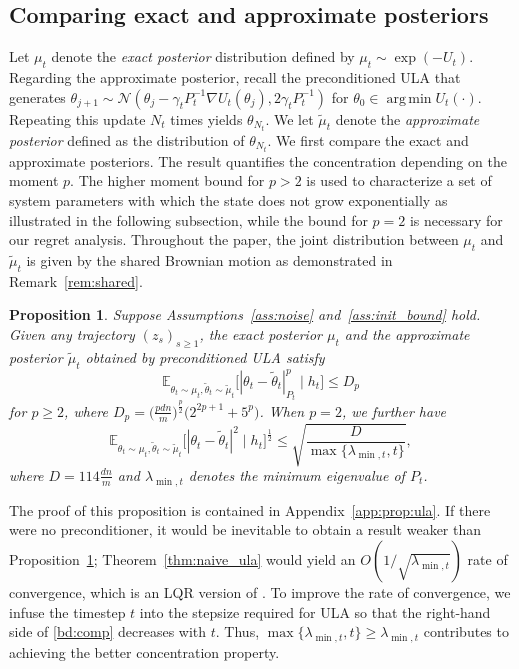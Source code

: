 \documentclass[11pt]{article}
\theoremstyle{plain}
\newtheorem{prop}[thm]{Proposition}
\theoremstyle{definition}
\theoremstyle{remark}
\DeclareMathOperator*{\argmin}{arg\,min}
\begin{document}
\subsection{Comparing exact and approximate posteriors}

Let $\mu_t$ denote the \emph{exact posterior} distribution defined by $\mu_t \sim \exp (-U_t)$.
Regarding the approximate posterior, recall the preconditioned ULA that generates
$\theta_{j+1} \sim \mathcal{N} ( \theta_j - \gamma_t P_t^{-1} \nabla U_t (\theta_j), 2\gamma_t P_t^{-1})$ for $\theta_0 \in  \argmin U_t (\cdot)$.
Repeating this update $N_t$ times yields $\theta_{N_t}$.
We let $\tilde{\mu}_t$ denote the \emph{approximate posterior} defined as the distribution of $\theta_{N_t}$. 
We first compare the exact and approximate posteriors. 
The result quantifies the concentration depending on the moment $p$. The higher moment bound for $p>2$ is used to characterize a set of system parameters with which the state does not grow exponentially as illustrated in the following subsection, while the bound for $p=2$ is necessary for our regret analysis.
Throughout the paper, the joint distribution between $\mu_t$ and $\tilde \mu_t$ is given by the shared Brownian motion as demonstrated in Remark~\ref{rem:shared}.
\begin{prop}\label{prop:ula}
Suppose Assumptions~\ref{ass:noise} and~\ref{ass:init_bound} hold. 
Given any trajectory $(z_s)_{s\geq1}$, the exact posterior $\mu_t$ and the approximate posterior $\tilde{\mu}_t$ obtained by preconditioned ULA satisfy 
\[
\mathbb{E}_{\theta_t \sim \mu_t, \tilde{\theta}_t \sim \tilde{\mu}_t}\big[
| \theta_t - \tilde{\theta}_t |^p_{P_t} \mid h_{t}
\big ] \leq D_p
\]
for $p\geq 2$,
where $D_p = \big(\frac{pdn}{m}\big)^{\frac{p}{2}}\big(2^{2p+1}+5^p\big)$. When $p=2$, we further have
\begin{equation}\label{bd:comp}
\mathbb{E}_{\theta_t \sim \mu_t, \tilde{\theta}_t \sim \tilde{\mu}_t}\big[
| \theta_t - \tilde{\theta}_t |^2 \mid h_{t}
\big ]^{\frac{1}{2}} \leq \sqrt{\frac{D}{\max\{\lambda_{\min,t}, t\}}},
\end{equation}
where $D = 114\frac{dn}{m}$ and $\lambda_{\min,t}$ denotes the minimum eigenvalue of $P_t$.
\end{prop}

The proof of this proposition is contained in Appendix~\ref{app:prop:ula}.
If there were no preconditioner, it would be inevitable to obtain a result weaker than Proposition~\ref{prop:ula}; Theorem~\ref{thm:naive_ula} would yield an $O({1}/{\sqrt{\lambda_{\min,t}}})$ rate of convergence, which is an LQR version of \cite[Theorem 5]{mazumdar2020thompson}.
To improve the rate of convergence, we infuse the timestep $t$ into the stepsize required for ULA so that the right-hand side of \eqref{bd:comp} decreases with $t$. 
Thus, $\max\{\lambda_{\min,t}, t\} \geq \lambda_{\min,t}$ contributes to achieving the better concentration property.
\end{document}
